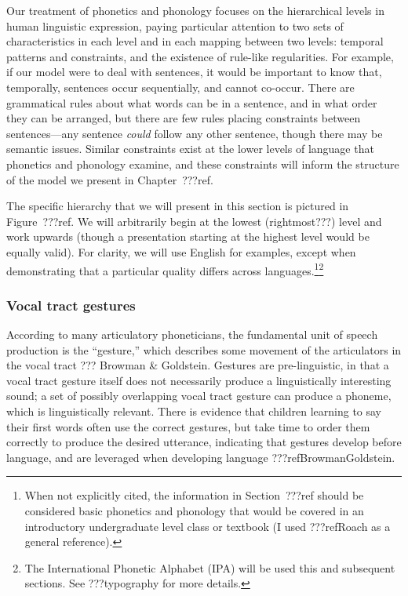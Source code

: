 Our treatment of phonetics and phonology
focuses on the hierarchical levels
in human linguistic expression,
paying particular attention to two
sets of characteristics in each level
and in each mapping between two levels:
temporal patterns and constraints,
and the existence of rule-like regularities.
For example,
if our model were to deal with sentences,
it would be important to know that,
temporally, sentences occur sequentially,
and cannot co-occur.
There are grammatical rules
about what words can be in a sentence,
and in what order they can be arranged,
but there are few rules placing constraints
between sentences---any sentence \textit{could}
follow any other sentence,
though there may be semantic issues.
Similar constraints exist at
the lower levels of language that
phonetics and phonology examine,
and these constraints will
inform the structure of the model
we present in Chapter~???ref.

The specific hierarchy that we will
present in this section is pictured
in Figure~???ref.
We will arbitrarily begin at
the lowest (rightmost???) level and work upwards
(though a presentation starting at
the highest level would be equally valid).
For clarity, we will use English for examples,
except when demonstrating that a particular
quality differs across languages.\footnote{
  When not explicitly cited,
  the information in Section~???ref
  should be considered
  basic phonetics and phonology
  that would be covered in an
  introductory undergraduate level
  class or textbook
  (I used ???refRoach as a general reference).
}\footnote{The International Phonetic Alphabet (IPA)
  will be used this and subsequent sections.
  See ???typography for more details.}


\subsubsection{Vocal tract gestures}

According to many articulatory phoneticians,
the fundamental unit of speech production
is the ``gesture,''
which describes some movement
of the articulators in the vocal tract
??? Browman \& Goldstein.
Gestures are pre-linguistic,
in that a vocal tract gesture itself
does not necessarily produce
a linguistically interesting sound;
a set of possibly overlapping
vocal tract gesture can produce a phoneme,
which is linguistically relevant.
There is evidence that children
learning to say their first words
often use the correct gestures,
but take time to order them correctly
to produce the desired utterance,
indicating that gestures develop
before language,
and are leveraged when
developing language
???refBrowmanGoldstein.

